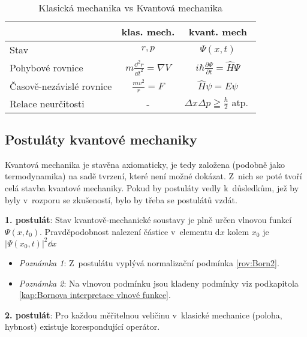 \begin{table}
\centering
\caption{Klasická mechanika vs Kvantová mechanika}
\renewcommand{\arraystretch}{1.8}
\begin{tabular}{p{7cm}cc}
\toprule
 & klas. mech. & kvant. mech\\
\midrule
Stav &$r, p$  & $\Psi(x,t)$ \\
Pohybové rovnice & $m\frac{\dd ^2 r}{\dd t^2} = \nabla V$ & $ i\hbar\frac{\partial \Psi}{\partial t} = \hat{H}\Psi$\\
Časově-nezávislé rovnice & $\frac{mv^2}{r} = F $ & $\hat{H}\psi = E\psi$ \\
Relace neurčitosti & - & $\Delta x \Delta p \geqq \frac{\hbar}{2} \mbox {          atp. }$ \\
\bottomrule
\end{tabular}
\end{table}


\subsection{Postuláty kvantové mechaniky}

Kvantová mechanika je stavěna axiomaticky, je tedy založena (podobně jako termodynamika) na sadě tvrzení, které není možné dokázat. Z~nich se poté tvoří celá stavba kvantové mechaniky. Pokud by postuláty vedly k~důsledkům, jež by byly v~rozporu se zkušeností, bylo by třeba se postulátů vzdát.

{\bf 1. postulát}: Stav kvantově-mechanické soustavy je plně určen vlnovou funkcí $\Psi(x,t_0)$. Pravděpodobnost nalezení částice v~elementu d$x$ kolem $x_0$ je  $|\Psi(x_0,t)|^2\dd x$

\begin{itemize}
\item \textit{Poznámka 1}: Z~postulátu vyplývá normalizační podmínka \ref{rov:Born2}.
\item \textit{Poznámka 2}: Na vlnovou podmínku jsou kladeny podmínky viz podkapitola \ref{kap:Bornova interpretace vlnové funkce}.
\end{itemize}

{\bf 2. postulát}: Pro každou měřitelnou veličinu v~klasické mechanice (poloha, hybnost) existuje korespondující operátor.

